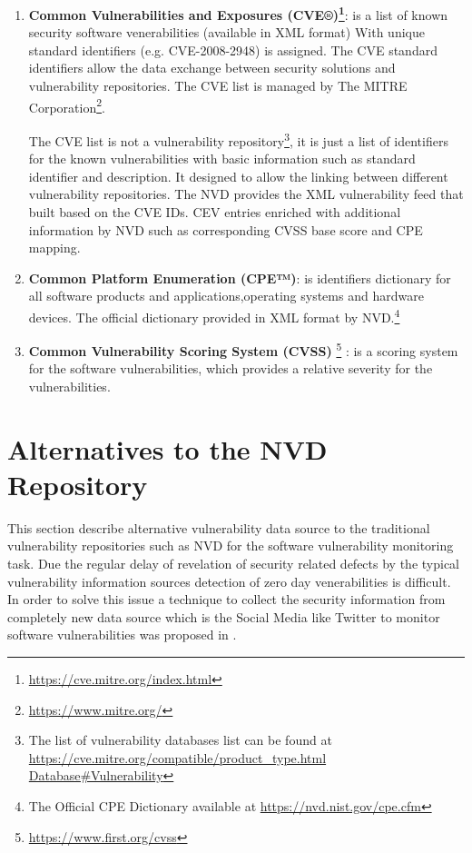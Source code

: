 \documentclass{llncs}
\begin{document}
 \begin{enumerate}
 \item \textbf{Common Vulnerabilities and Exposures (CVE®)\footnote{\url{https://cve.mitre.org/index.html}}}: is a list of known security software venerabilities (available in XML format) With unique standard identifiers (e.g. CVE-2008-2948) is assigned. The CVE standard identifiers allow the data exchange between security solutions and vulnerability repositories. The CVE list is managed by The MITRE Corporation\footnote{\url{https://www.mitre.org/}}.
 \par
 The CVE list is not a vulnerability repository\footnote{The list of vulnerability databases list can be found at \url{https://cve.mitre.org/compatible/product_type.html Database\#Vulnerability}}, it is just a list of identifiers for the known vulnerabilities with basic information such as standard identifier and description. It designed to allow the linking between different vulnerability repositories. The NVD provides the XML vulnerability feed that built based on the CVE IDs. CEV entries enriched with additional information by NVD such as corresponding CVSS base score and CPE mapping.    
 
 \item \textbf{Common Platform Enumeration (CPE™)}: is identifiers dictionary for all software products and applications,operating systems and hardware devices. The official dictionary provided in XML format by NVD.\footnote{The Official CPE Dictionary available at \url{https://nvd.nist.gov/cpe.cfm}}
  
 \item \textbf{Common Vulnerability Scoring System (CVSS)} \footnote{\url{https://www.first.org/cvss}} : is a scoring system for the software  vulnerabilities, which provides a relative severity for the vulnerabilities.
 \end{enumerate}
 

\section{Alternatives to the NVD Repository}

\par This section describe alternative vulnerability data source to the traditional vulnerability repositories such as NVD for the software vulnerability monitoring task. Due the regular delay of revelation of security related defects by the typical vulnerability information sources detection of zero day venerabilities is difficult. In order to solve this issue a technique to collect the security information from completely new data source which is the Social Media like Twitter to monitor software vulnerabilities was proposed in \cite{paper2}.
\par
\end{document}
